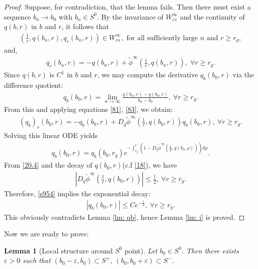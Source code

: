 \documentclass[12pt]{amsart}
\newcommand{\eps}{\varepsilon}
\newtheorem{lemma}[theorem]{Lemma}
\begin{document}
\begin{proof}
Suppose, for contradiction, that the lemma fails. Then there must exist a sequence $b_n\to b_0$ with $b_n\in S^0$. By the invariance of $W_{cs}^\infty$ and the continuity of $q(b,r)$ in $b$ and $r$, it follows that
\begin{align*}
 (\frac 1{r}, q(b_n,r), q_r(b_n, r))\in W_{cs}^\infty, \mbox{ for all sufficiently large } n \mbox{ and }r\ge r_g,
 \end{align*}
 and, 
\begin{align}\label{83}
q_r(b_n, r)=-q(b_n,r)+\tilde \phi^\infty(\tfrac 1r, q(b_n,r)), \; \forall r\ge r_g. 
\end{align}
Since
$q(b, r)$ is $C^1$ in $b$ and $r$, we may compute the derivative $q_b(b_0,r)$ via the difference quotient:  
\begin{align*}
q_b(b_0, r)=\lim_{n\to \infty}\tfrac{q(b_n, r)-q(b_0,r)}{b_n-b_0}, \ \forall r\ge r_g.
\end{align*}
From this and applying equations \eqref{81}, \eqref{83}, we obtain: 
\begin{align}\label{85}
(q_b)_r(b_0,r)=-q_b(b_0,r)+D_q \tilde \phi^\infty(\tfrac 1r, q(b_0,r))q_b(b_0,r), \ \forall r\ge r_g.
\end{align}
Solving this linear ODE yields
\begin{align}\label{s954}
q_b(b_0,r)=q_b(b_0,r_g) e^{-\int_{r_g}^r(1- D_q\tilde\phi^\infty(\tfrac 1\rho,  q(b_0,\rho)))d\rho}. 
\end{align}
From \eqref{20.4} and the decay of $q(b_0,r)$(c.f \eqref{18}), we have 
\begin{align*}
|D_q\tilde \phi^{\infty}(\tfrac 1r, q(b_0,r))|\le \tfrac 12, \ \forall r\ge r_g.
\end{align*} 
Therefore, \eqref{s954} implies the exponential decay: 
\begin{align*}
|q_b(b_0,r)|\le C e^{-\frac r2}, \ \forall r\ge r_g.
\end{align*}
This obviously contradicts Lemma \ref{lm: qb}, hence Lemma \ref{lm: i} is proved. 
\end{proof}




Now we are ready to prove: 

\begin{lemma}[Local structure around $S^0$ point]\label{lm: s} Let $b_0\in S^0$. Then there exists $\eps>0$ such that $(b_0-\eps, b_0)\subset S^+$, $(b_0,b_0+\eps)\subset S^-$. 
\end{lemma}
\end{document}
